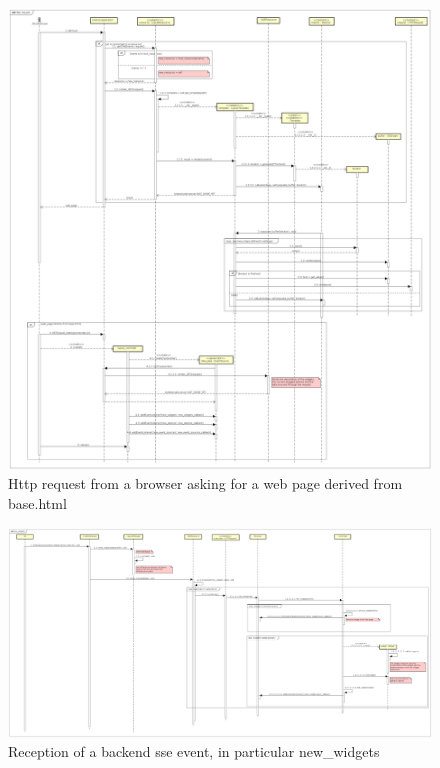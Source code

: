 \documentclass[12pt]{article}
\begin{document}
            \thispagestyle{empty}
                \begin{figure}[h]
                    \centering
                    \includegraphics[width=1.15\textwidth]{http_request}
                    \caption{Http request from a browser asking for a web page
                    derived from base.html}
                \end{figure}
            \restoregeometry

            \thispagestyle{empty}
            \begin{landscape}
                \begin{figure}[h]
                    \centering
                    \includegraphics[height=0.75\textheight]{new_widgets}
                    \caption{Reception of a backend sse event, in particular
                    new\_widgets}
                \end{figure}
            \end{landscape}
            \restoregeometry
\end{document}
